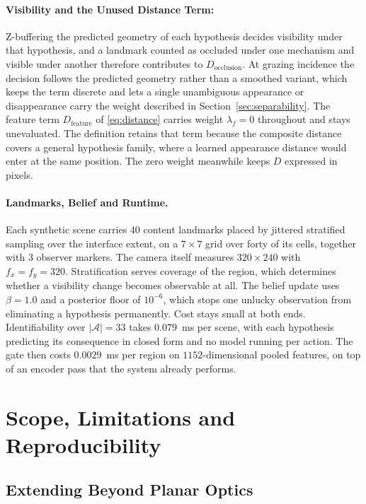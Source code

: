 \documentclass{article} %
\theoremstyle{defstyle}
\theoremstyle{plain}
\begin{document}
\paragraph{Visibility and the Unused Distance Term:}
Z-buffering the predicted geometry of each hypothesis decides visibility under that hypothesis,
and a landmark counted as occluded under one mechanism and visible under another therefore
contributes to $D_{\text{occlusion}}$. At grazing incidence the decision follows the predicted
geometry rather than a smoothed variant, which keeps the term discrete and lets a single
unambiguous appearance or disappearance carry the weight described in
Section~\ref{sec:separability}. The feature term $D_{\text{feature}}$ of \eqref{eq:distance}
carries weight $\lambda_f = 0$ throughout and stays unevaluated. The definition retains that
term because the composite distance covers a general hypothesis family, where a learned
appearance distance would enter at the same position. The zero weight meanwhile keeps $D$
expressed in pixels.

\paragraph{Landmarks, Belief and Runtime.}
Each synthetic scene carries $40$ content landmarks placed by jittered stratified sampling over
the interface extent, on a $7 \times 7$ grid over forty of its cells, together with $3$
observer markers. The camera itself measures $320 \times 240$ with $f_x = f_y = 320$.
Stratification serves coverage of the region, which determines whether a visibility change
becomes observable at all. The belief update uses $\beta = 1.0$ and a posterior floor of
$10^{-6}$, which stops one unlucky observation from eliminating a hypothesis permanently. Cost
stays small at both ends. Identifiability over $|\mathcal{A}| = 33$ takes $0.079$~ms per scene,
with each hypothesis predicting its consequence in closed form and no model running per action.
The gate then costs $0.0029$~ms per region on $1152$-dimensional pooled features, on top of an
encoder pass that the system already performs.

\section{Scope, Limitations and Reproducibility}

\subsection{Extending Beyond Planar Optics}
\label{sec:supp-extension}
\end{document}
